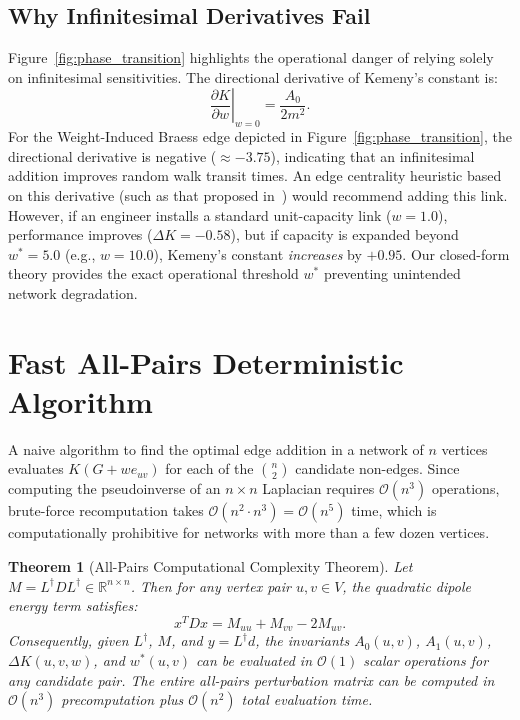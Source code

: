 \documentclass[11pt,a4paper]{article}
\theoremstyle{plain}
\newtheorem{theorem}{Theorem}[section]
\theoremstyle{definition}
\begin{document}
\subsection{Why Infinitesimal Derivatives Fail}
Figure~\ref{fig:phase_transition} highlights the operational danger of relying solely on infinitesimal sensitivities. The directional derivative of Kemeny's constant is:
\begin{equation}
    \left.\frac{\partial K}{\partial w}\right|_{w=0} = \frac{A_0}{2m^2}.
\end{equation}
For the Weight-Induced Braess edge depicted in Figure~\ref{fig:phase_transition}, the directional derivative is negative ($\approx -3.75$), indicating that an infinitesimal addition improves random walk transit times. An edge centrality heuristic based on this derivative (such as that proposed in~\cite{bini2023edge}) would recommend adding this link. However, if an engineer installs a standard unit-capacity link ($w = 1.0$), performance improves ($\Delta K = -0.58$), but if capacity is expanded beyond $w^* = 5.0$ (e.g., $w = 10.0$), Kemeny's constant \textit{increases} by $+0.95$. Our closed-form theory provides the exact operational threshold $w^*$ preventing unintended network degradation.

\section{Fast All-Pairs Deterministic Algorithm}
\label{sec:algorithms}

A naive algorithm to find the optimal edge addition in a network of $n$ vertices evaluates $K(G + w e_{uv})$ for each of the $\binom{n}{2}$ candidate non-edges. Since computing the pseudoinverse of an $n \times n$ Laplacian requires $\mathcal{O}(n^3)$ operations, brute-force recomputation takes $\mathcal{O}(n^2 \cdot n^3) = \mathcal{O}(n^5)$ time, which is computationally prohibitive for networks with more than a few dozen vertices.

\begin{theorem}[All-Pairs Computational Complexity Theorem]
\label{thm:complexity}
Let $M = L^\dagger D L^\dagger \in \mathbb{R}^{n \times n}$. Then for any vertex pair $u, v \in V$, the quadratic dipole energy term satisfies:
\begin{equation}
    x^T D x = M_{uu} + M_{vv} - 2 M_{uv}.
\end{equation}
Consequently, given $L^\dagger$, $M$, and $y = L^\dagger d$, the invariants $A_0(u, v)$, $A_1(u, v)$, $\Delta K(u, v, w)$, and $w^*(u, v)$ can be evaluated in $\mathcal{O}(1)$ scalar operations for any candidate pair. The entire all-pairs perturbation matrix can be computed in $\mathcal{O}(n^3)$ precomputation plus $\mathcal{O}(n^2)$ total evaluation time.
\end{theorem}
\end{document}
